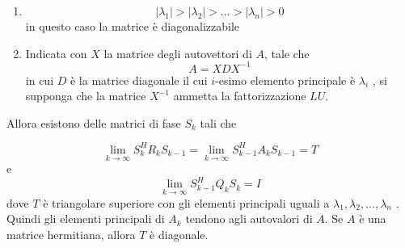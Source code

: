\begin{theo}[Convergenza]
\begin{enumerate}
\item $$ | \lambda_1| > | \lambda_2 | > \ldots > | \lambda_n | > 0 $$
in questo caso la matrice \`e diagonalizzabile
\item
Indicata con $X$ la matrice degli autovettori di $A$, tale che
\begin{equation}
 \label{eigenvalues:19}
A = XDX ^{-1}
\end{equation}
in cui $D$ \`e la matrice diagonale il cui $i$-esimo elemento principale \`e $\lambda_i$ ,
si supponga che la matrice $X^{-1}$ ammetta la fattorizzazione $LU$.
\end{enumerate}
 Allora
esistono delle matrici di fase $S_k$ tali che

\begin{equation}
 \label{eigenvalues:20}
\lim_{k \to \infty} S_k^{H} R_k S_{k-1} = \lim_{k \to \infty} S_{k-1}^{H} A_k S_{k-1} =T
\end{equation}
e
$$\lim_{k \to \infty} S_{k-1}^{H} Q_k S_k = I$$
dove $T$ \`e triangolare superiore con gli elementi principali uguali a
$\lambda_1 , \lambda_2 , \ldots,  \lambda_n$ .
 Quindi gli elementi principali di $A_k$ tendono agli autovalori di $A$. Se $A$
\`e una matrice hermitiana, allora $T$ \`e diagonale.
\end{theo}
